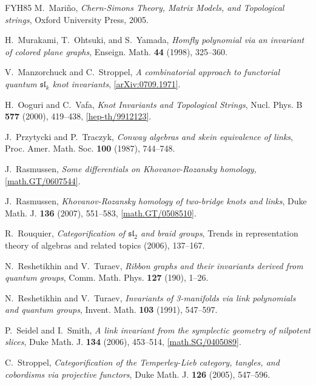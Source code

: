 \documentclass{compositio}
\theoremstyle{definition}
\numberwithin{equation}{section}
\begin{document}
\begin{thebibliography}{FYH{\etalchar{+}}85}
M.~Mari\~{n}o, \emph{Chern-{S}imons {T}heory, {M}atrix {M}odels, and
  {T}opological s{t}rings}, Oxford University Press, 2005.

H.~Murakami, T.~Ohtsuki, and S.~Yamada, \emph{Homfly polynomial via an
  invariant of colored plane graphs}, Enseign. Math. \textbf{44} (1998),
  325--360.

V.~Manzorchuck and C.~Stroppel, \emph{A combinatorial approach to functorial
  quantum {$\mathfrak{sl}_k$} knot invariants},
  \href{http://arxiv.org/abs/0709.1971}{[arXiv:0709.1971]}.

H.~Ooguri and C.~Vafa, \emph{Knot {I}nvariants and {T}opological {S}trings},
  Nucl. Phys. B \textbf{577} (2000), 419--438,
  \href{http://arxiv.org/abs/hep-th/9912123}{[hep-th/9912123]}.

J.~Przytycki and P.~Traczyk, \emph{Conway algebras and skein equivalence of
  links}, Proc. Amer. Math. Soc. \textbf{100} (1987), 744--748.

J.~Rasmussen, \emph{Some differentials on {K}hovanov-{R}ozansky homology},
  \href{http://arxiv.org/abs/math/0607544}{[math.GT/0607544]}.

J.~Rasmussen, \emph{Khovanov-{R}ozansky homology of two-bridge knots and links},
  Duke Math. J. \textbf{136} (2007), 551--583,
  \href{http://arxiv.org/abs/math/0508510}{[math.GT/0508510]}.
  
R.~Rouquier, \emph{Categorification of {$\mathfrak{sl}_{2}$} and braid groups},
  Trends in representation theory of algebras and related topics (2006),
  137--167.

N.~Reshetikhin and V.~Turaev, \emph{Ribbon graphs and their invariants derived
  from quantum groups}, Comm. Math. Phys. \textbf{127} (190), 1--26.

N.~Reshetikhin and V.~Turaev, \emph{Invariants of 3-manifolds via link polynomials and quantum
  groups}, Invent. Math. \textbf{103} (1991), 547--597.

P.~Seidel and I.~Smith, \emph{A link invariant from the symplectic geometry of
  nilpotent slices}, Duke Math. J. \textbf{134} (2006), 453--514,
  \href{http://arxiv.org/abs/math/0405089}{[math.SG/0405089]}.

C.~Stroppel, \emph{Categorification of the {T}emperley-{L}ieb category,
  tangles, and cobordisms via projective functors}, Duke Math. J. \textbf{126}
  (2005), 547--596.


\end{thebibliography}
\end{document}
